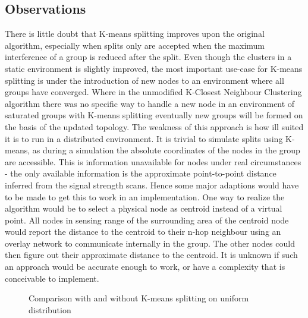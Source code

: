 \subsection{Observations}
There is little doubt that K-means splitting improves upon the original algorithm, especially when splits only are accepted when the maximum interference of a group is reduced after the split.
Even though the clusters in a static environment is slightly improved, the most important use-case for K-means splitting is under the introduction of new nodes to an environment
where all groups have converged. Where in the unmodified K-Closest Neighbour Clustering algorithm there was no specific way to handle a new node in an environment of saturated groups
with K-means splitting eventually new groups will be formed on the basis of the updated topology. The weakness of this approach is how ill suited it is to run in a distributed environment.
It is trivial to simulate splits using K-means, as during a simulation the absolute coordinates of the nodes in the group are accessible. This is information unavailable for nodes under
real circumstances - the only available information is the approximate point-to-point distance inferred from the signal strength scans.
Hence some major adaptions would have to be made to get this to work in an implementation.
One way to realize the algorithm would be to select a physical node as centroid instead of a virtual point. All nodes in sensing range of the surrounding area of
the centroid node would report the distance to the centroid to their n-hop neighbour using an overlay network to communicate internally in the group. The other nodes could
then figure out their approximate distance to the centroid. It is unknown if such an approach would be accurate enough to work, or have a complexity that is conceivable to implement.  

\begin{figure}
	\centering
		\qquad
		\caption{Comparison with and without K-means splitting on uniform distribution}%
		\label{fig:kmeanscomparisonuniform}%
\end{figure}


